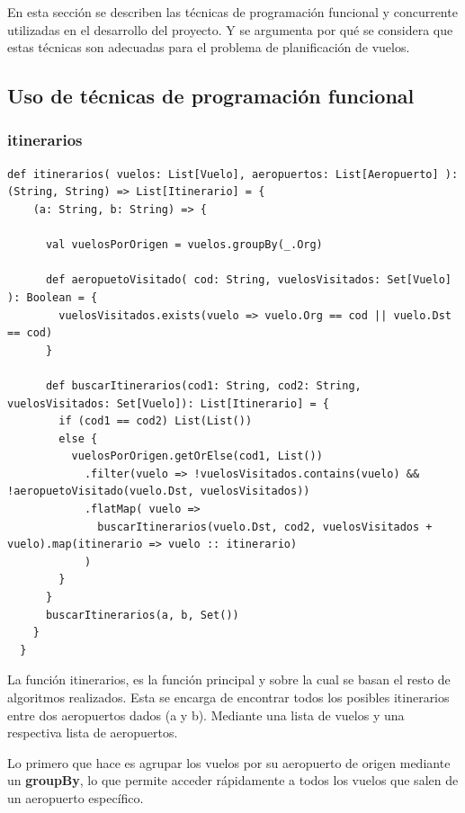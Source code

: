 \documentclass[letterpaper]{article}
\begin{document}
En esta sección se describen las técnicas de programación funcional y concurrente utilizadas en el desarrollo del proyecto.
Y se argumenta por qué se considera que estas técnicas son adecuadas para el problema de planificación de vuelos.

\subsection{Uso de técnicas de programación funcional}

\subsubsection{itinerarios}\label{itinerarios}

\begin{lstlisting}[caption={Función para obtener los itinerarios disponibles entre dos aeropuertos}, label={lst:itinerarios}, captionpos=b]
  def itinerarios( vuelos: List[Vuelo], aeropuertos: List[Aeropuerto] ): (String, String) => List[Itinerario] = {
    (a: String, b: String) => { 

      val vuelosPorOrigen = vuelos.groupBy(_.Org)

      def aeropuetoVisitado( cod: String, vuelosVisitados: Set[Vuelo] ): Boolean = {
        vuelosVisitados.exists(vuelo => vuelo.Org == cod || vuelo.Dst == cod)
      }

      def buscarItinerarios(cod1: String, cod2: String, vuelosVisitados: Set[Vuelo]): List[Itinerario] = {
        if (cod1 == cod2) List(List())
        else {
          vuelosPorOrigen.getOrElse(cod1, List())
            .filter(vuelo => !vuelosVisitados.contains(vuelo) && !aeropuetoVisitado(vuelo.Dst, vuelosVisitados))
            .flatMap( vuelo => 
              buscarItinerarios(vuelo.Dst, cod2, vuelosVisitados + vuelo).map(itinerario => vuelo :: itinerario) 
            )
        }  
      }
      buscarItinerarios(a, b, Set())
    }    
  }
\end{lstlisting}

La función itinerarios, es la función principal y sobre la cual se basan el resto de algoritmos realizados. Esta se encarga de encontrar todos los posibles itinerarios entre dos aeropuertos dados (a y b). Mediante una lista de vuelos y una respectiva lista de aeropuertos.

Lo primero que hace es agrupar los vuelos por su aeropuerto de origen mediante un \textbf{groupBy}, lo que permite acceder rápidamente a todos los vuelos que salen de un aeropuerto específico.
\end{document}
